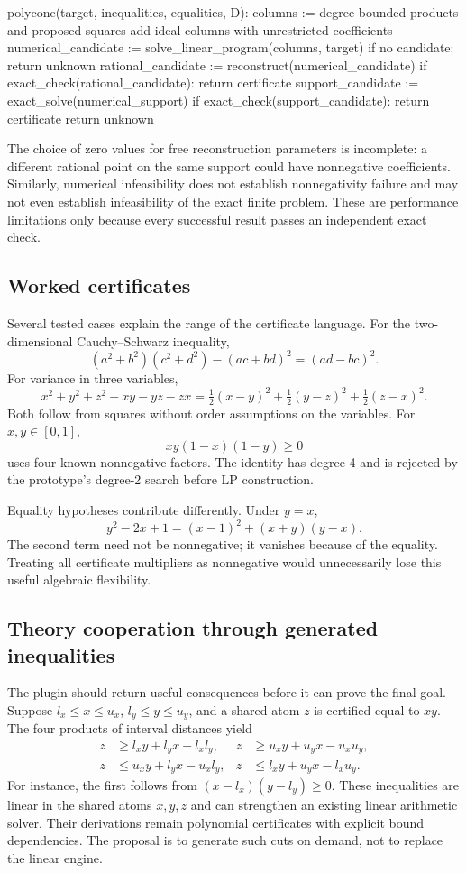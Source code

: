 \begin{Code}
polycone(target, inequalities, equalities, D):
  columns := degree-bounded products and proposed squares
  add ideal columns with unrestricted coefficients
  numerical_candidate := solve_linear_program(columns, target)
  if no candidate: return unknown
  rational_candidate := reconstruct(numerical_candidate)
  if exact_check(rational_candidate): return certificate
  support_candidate := exact_solve(numerical_support)
  if exact_check(support_candidate): return certificate
  return unknown
\end{Code}

The choice of zero values for free reconstruction parameters is incomplete:
a different rational point on the same support could have nonnegative
coefficients. Similarly, numerical infeasibility does not establish
nonnegativity failure and may not even establish infeasibility of the exact
finite problem. These are performance limitations only because every
successful result passes an independent exact check.

\subsection{Worked certificates}

Several tested cases explain the range of the certificate language.
For the two-dimensional Cauchy--Schwarz inequality,
\[
 (a^2+b^2)(c^2+d^2)-(ac+bd)^2=(ad-bc)^2.
\]
For variance in three variables,
\[
 x^2+y^2+z^2-xy-yz-zx
 =\tfrac12(x-y)^2+\tfrac12(y-z)^2+\tfrac12(z-x)^2.
\]
Both follow from squares without order assumptions on the variables.
For $x,y\in[0,1]$,
\[
 xy(1-x)(1-y)\geq0
\]
uses four known nonnegative factors. The identity has degree 4 and is rejected
by the prototype's degree-2 search before LP construction.

Equality hypotheses contribute differently. Under $y=x$,
\[
 y^2-2x+1=(x-1)^2+(x+y)(y-x).
\]
The second term need not be nonnegative; it vanishes because of the equality.
Treating all certificate multipliers as nonnegative would unnecessarily lose
this useful algebraic flexibility.

\subsection{Theory cooperation through generated inequalities}

The plugin should return useful consequences before it can prove the final
goal. Suppose $l_x\leq x\leq u_x$, $l_y\leq y\leq u_y$, and a shared atom
$z$ is certified equal to $xy$. The four products of interval distances yield
\begin{align*}
 z&\geq l_x y+l_y x-l_xl_y, &
 z&\geq u_x y+u_y x-u_xu_y,\\
 z&\leq u_x y+l_y x-u_xl_y, &
 z&\leq l_x y+u_y x-l_xu_y.
\end{align*}
For instance, the first follows from $(x-l_x)(y-l_y)\geq0$.
These inequalities are linear in the shared atoms $x,y,z$ and can strengthen
an existing linear arithmetic solver. Their derivations remain polynomial
certificates with explicit bound dependencies. The proposal is to generate
such cuts on demand, not to replace the linear engine.

